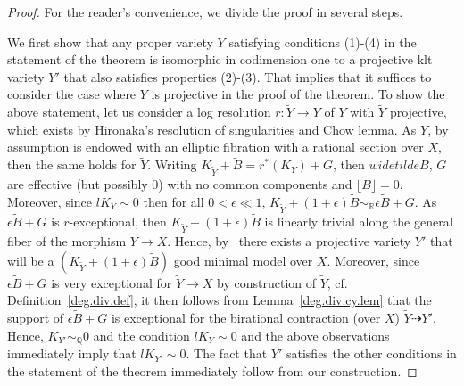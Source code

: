 \documentclass[11pt]{ip-journal}
\theoremstyle{definition}
\begin{document}
\begin{proof}
For the reader's convenience, we divide the proof in several steps. 

We first show that any proper variety 
$Y$ 
satisfying conditions 
(1)-(4)
in the statement of the theorem is isomorphic in codimension one to a projective klt variety 
$Y'$ 
that also satisfies properties 
(2)-(3).
That implies that it suffices to consider the case where $Y$ is projective in the proof of the theorem.
To show the above statement, let us consider a log resolution
$r \colon \widetilde Y \to Y$ 
of 
$Y$
with 
$\widetilde Y$ 
projective, which exists by Hironaka's resolution of singularities and Chow lemma.
As 
$Y$, 
by assumption is endowed with an elliptic fibration with a rational section over 
$X$, 
then the same holds for 
$\widetilde Y$.
Writing 
$K_{\widetilde Y}+\widetilde B=r^\ast(K_Y)+G$, 
then 
$widetilde B$, $G$
are effective 
(but possibly $0$) 
with no common components and 
$\lfloor \widetilde B \rfloor=0$.
Moreover, since 
$lK_Y \sim 0$
then for all 
$0< \epsilon \ll 1$, 
$K_{\widetilde Y}+(1+\epsilon)\widetilde B 
\sim_{\mathbb R} 
\epsilon \widetilde B + G$.
As 
$ \epsilon \widetilde B + G$
is 
$r$-exceptional, 
then 
$K_{\widetilde Y}+(1+\epsilon)\widetilde B$
is linearly trivial along the general fiber of the morphism 
$\widetilde Y \to X$.
Hence, by~
there exists a projective variety 
$Y'$
that will be a
$(K_{\widetilde Y}+(1+\epsilon)\widetilde B)$ good minimal model over 
$X$.
Moreover, since 
$ \epsilon \widetilde B + G$
is very exceptional for 
$\widetilde Y \to X$ 
by construction of 
$\widetilde Y$,
cf. Definition~\ref{deg.div.def},
it then follows from 
Lemma~\ref{deg.div.cy.lem} 
that the support of 
$ \epsilon \widetilde B + G$
is exceptional for the birational contraction (over $X$)
$\widetilde Y \dashrightarrow Y'$.
Hence, 
$K_{Y'} \sim_{\mathbb Q} 0$
and the condition 
$lK_Y \sim 0$
and the above observations immediately imply that
$lK_{Y'} \sim 0$.
The fact that $Y'$ satisfies the other conditions in the statement of the theorem immediately follow from our construction.

\medskip


\end{proof}
\end{document}
